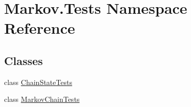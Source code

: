 \hypertarget{namespace_markov_1_1_tests}{}\section{Markov.\+Tests Namespace Reference}
\label{namespace_markov_1_1_tests}
\subsection*{Classes}
\begin{DoxyCompactItemize}
\item 
class \mbox{\hyperlink{class_markov_1_1_tests_1_1_chain_state_tests}{Chain\+State\+Tests}}
\item 
class \mbox{\hyperlink{class_markov_1_1_tests_1_1_markov_chain_tests}{Markov\+Chain\+Tests}}
\end{DoxyCompactItemize}
